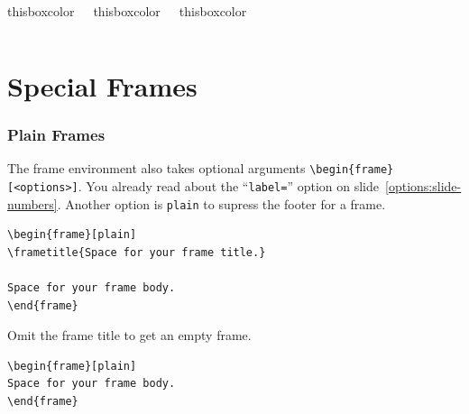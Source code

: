 \documentclass[utf8,aspectratio=169,ngerman,english]{beamer}
\begin{document}
\begin{frame}
\begin{columns}[onlytextwidth,T]
\vspace{2em}
\begin{beamercolorbox}[wd=\linewidth,ht=4ex,dp=2.5ex]{thisboxcolor}
\centering
{}
\end{beamercolorbox}


\begin{beamercolorbox}[wd=\linewidth,ht=4ex,dp=2.5ex]{thisboxcolor}
\centering
{}
\end{beamercolorbox}

\vspace{2em}
\begin{beamercolorbox}[wd=\linewidth,ht=4ex,dp=2.5ex]{thisboxcolor}
\centering
{}
\end{beamercolorbox}

\end{columns}
\end{frame}


\section{Special Frames}

\begin{frame}
\frametitle{Plain Frames}

The frame environment also takes optional arguments \verb|\begin{frame}[<options>]|. You already read about the ``\verb|label=|'' option on slide~\ref{options:slide-numbers}. Another option is \verb|plain| to supress the footer for a frame.

\begin{lstlisting}[language={[LaTeX]TeX},numbers=none]
\begin{frame}[plain]
\frametitle{Space for your frame title.}

Space for your frame body.
\end{frame}
\end{lstlisting}
\end{frame}


\begin{frame}
Omit the frame title to get an empty frame.

\begin{lstlisting}[language={[LaTeX]TeX},numbers=none]
\begin{frame}[plain]
Space for your frame body.
\end{frame}
\end{lstlisting}
\end{frame}
\end{document}
